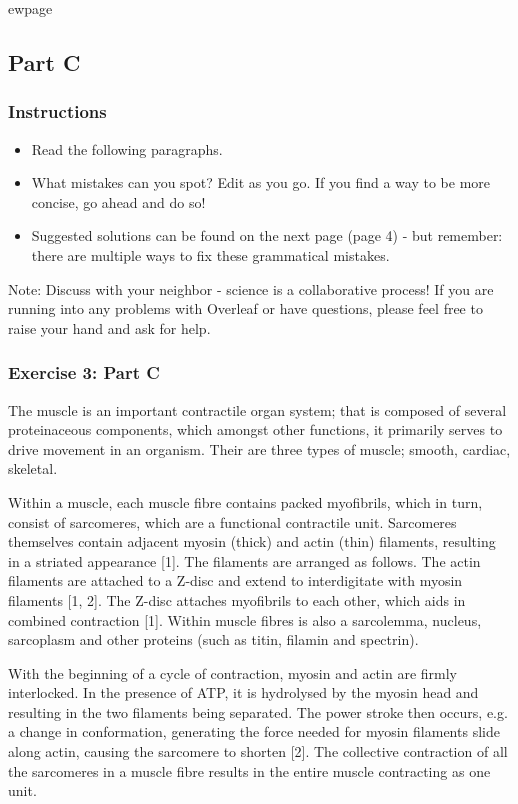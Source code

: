 \documentclass{article}
\begin{document}
ewpage
\subsection*{Part C}

\subsubsection*{Instructions}

\begin{itemize}
\item Read the following paragraphs.
\item What mistakes can you spot? Edit as you go. If you find a way to be more concise, go ahead and do so!
\item Suggested solutions can be found on the next page (page 4) - but remember: there are multiple ways to fix these grammatical mistakes. 
\end{itemize}

Note: Discuss with your neighbor - science is a collaborative process! If you are running into any problems with Overleaf or have questions, please feel free to raise your hand and ask for help. 

\subsubsection*{Exercise 3: Part C}

The muscle is an important contractile organ system; that is composed of several proteinaceous components, which amongst other functions, it primarily serves to drive movement in an organism. Their are three types of muscle; smooth, cardiac, skeletal. 

Within a muscle, each muscle fibre contains packed myofibrils, which in turn, consist of sarcomeres, which are a functional contractile unit. Sarcomeres themselves contain adjacent myosin (thick) and actin (thin) filaments, resulting in a striated appearance [1]. The filaments are arranged as follows. The actin filaments are attached to a Z-disc and extend to interdigitate with myosin filaments [1, 2]. The Z-disc attaches myofibrils to each other, which aids in combined contraction [1]. Within muscle fibres is also a sarcolemma, nucleus, sarcoplasm and other proteins (such as titin, filamin and spectrin).

With the beginning of a cycle of contraction, myosin and actin are firmly interlocked. In the presence of ATP, it is hydrolysed by the myosin head and resulting in the two filaments being separated. The power stroke then occurs, e.g. a change in conformation, generating the force needed for myosin filaments slide along actin, causing the sarcomere to shorten [2]. The collective contraction of all the sarcomeres in a muscle fibre results in the entire muscle contracting as one unit. 
\end{document}
